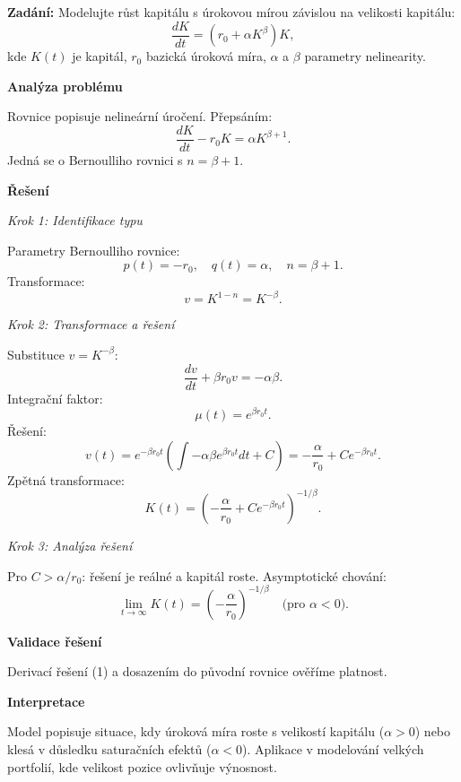 \begin{example}
\label{ex:c2-nelinearni-uroceni}

\noindent\textbf{Zadání:} Modelujte růst kapitálu s úrokovou mírou závislou na velikosti kapitálu:
\[
\frac{dK}{dt} = (r_0 + \alpha K^\beta)K,
\]
kde $K(t)$ je kapitál, $r_0$ bazická úroková míra, $\alpha$ a $\beta$ parametry nelinearity.

\vspace{1.5\baselineskip}

\noindent\textbf{Analýza problému}

\noindent Rovnice popisuje nelineární úročení. Přepsáním:
\[
\frac{dK}{dt} - r_0K = \alpha K^{\beta + 1}.
\]
Jedná se o Bernoulliho rovnici s $n = \beta + 1$.

\vspace{1.5\baselineskip}

\noindent\textbf{Řešení}

\noindent\textit{Krok 1: Identifikace typu}

Parametry Bernoulliho rovnice:
\[
p(t) = -r_0, \quad q(t) = \alpha, \quad n = \beta + 1.
\]
Transformace:
\[
v = K^{1-n} = K^{-\beta}.
\]

\noindent\textit{Krok 2: Transformace a řešení}

Substituce $v = K^{-\beta}$:
\[
\frac{dv}{dt} + \beta r_0 v = -\alpha\beta.
\]
Integrační faktor:
\[
\mu(t) = e^{\beta r_0 t}.
\]
Řešení:
\[
v(t) = e^{-\beta r_0 t} \left( \int -\alpha\beta e^{\beta r_0 t} dt + C \right) = -\frac{\alpha}{r_0} + Ce^{-\beta r_0 t}.
\]
Zpětná transformace:
\[
K(t) = \left( -\frac{\alpha}{r_0} + Ce^{-\beta r_0 t} \right)^{-1/\beta}. \tag{1}
\]

\noindent\textit{Krok 3: Analýza řešení}

Pro $C > \alpha/r_0$: řešení je reálné a kapitál roste.
Asymptotické chování:
\[
\lim_{t \to \infty} K(t) = \left( -\frac{\alpha}{r_0} \right)^{-1/\beta} \quad \text{(pro } \alpha < 0 \text{)}.
\]

\vspace{1.5\baselineskip}

\noindent\textbf{Validace řešení}

Derivací řešení (1) a dosazením do původní rovnice ověříme platnost.

\vspace{1.5\baselineskip}

\noindent\textbf{Interpretace}

Model popisuje situace, kdy úroková míra roste s velikostí kapitálu ($\alpha > 0$) 
nebo klesá v důsledku saturačních efektů ($\alpha < 0$). Aplikace v modelování 
velkých portfolií, kde velikost pozice ovlivňuje výnosnost.

\end{example}

